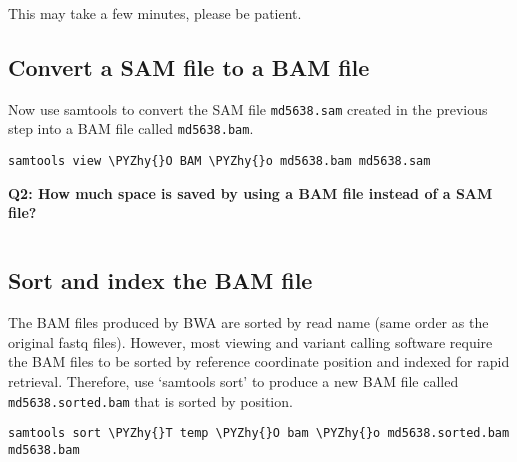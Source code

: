 \documentclass[11pt]{article}
\makeatletter
\def\PYZhy{\char`\-}
\newcommand{\boxspacing}{\kern\kvtcb@left@rule\kern\kvtcb@boxsep}
\newcommand{\prompt}[4]{
        \ttfamily\llap{{\color{#2}[#3]:\hspace{3pt}#4}}\vspace{-\baselineskip}
    }
\makeatother
\begin{document}
    This may take a few minutes, please be patient.

    \hypertarget{convert-a-sam-file-to-a-bam-file}{%
\subsection{Convert a SAM file to a BAM
file}\label{convert-a-sam-file-to-a-bam-file}}

Now use samtools to convert the SAM file \texttt{md5638.sam} created in
the previous step into a BAM file called \texttt{md5638.bam}.

    \begin{tcolorbox}[breakable, size=fbox, boxrule=1pt, pad at break*=1mm,colback=cellbackground, colframe=cellborder]
\prompt{In}{incolor}{ }{\boxspacing}
\begin{Verbatim}[commandchars=\\\{\}]
samtools view \PYZhy{}O BAM \PYZhy{}o md5638.bam md5638.sam
\end{Verbatim}
\end{tcolorbox}

    \textbf{Q2: How much space is saved by using a BAM file instead of a SAM
file?}

    \begin{tcolorbox}[breakable, size=fbox, boxrule=1pt, pad at break*=1mm,colback=cellbackground, colframe=cellborder]
\prompt{In}{incolor}{ }{\boxspacing}
\begin{Verbatim}[commandchars=\\\{\}]

\end{Verbatim}
\end{tcolorbox}

    \hypertarget{sort-and-index-the-bam-file}{%
\subsection{Sort and index the BAM
file}\label{sort-and-index-the-bam-file}}

The BAM files produced by BWA are sorted by read name (same order as the
original fastq files). However, most viewing and variant calling
software require the BAM files to be sorted by reference coordinate
position and indexed for rapid retrieval. Therefore, use `samtools sort'
to produce a new BAM file called \texttt{md5638.sorted.bam} that is
sorted by position.

    \begin{tcolorbox}[breakable, size=fbox, boxrule=1pt, pad at break*=1mm,colback=cellbackground, colframe=cellborder]
\prompt{In}{incolor}{ }{\boxspacing}
\begin{Verbatim}[commandchars=\\\{\}]
samtools sort \PYZhy{}T temp \PYZhy{}O bam \PYZhy{}o md5638.sorted.bam md5638.bam
\end{Verbatim}
\end{tcolorbox}
\end{document}
